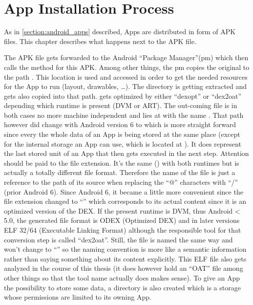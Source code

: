 \section{App Installation Process}\label{section:app_installation}
As in \autoref{section:android_apps} described, Apps are distributed
in form of APK files. This chapter describes what happens next to
the APK file.

The APK file gets forwarded to the Android ``Package Manager''(pm)
which then calls the  method for this
APK. Among other things, the pm copies the original 
to the path .
This location is used and accessed in order to get the
needed resources for the App to run (layout, drawables, \ldots).
The  directory is getting extracted and gets also copied
into that path.  gets optimized by either ``dexopt''
or ``dex2oat'' depending which runtime is present (DVM or ART).
The out-coming file is in both cases no more machine independent
and lies at  with the name
.
That path however did change with Android version 6 to
 which
is more straight forward since every the whole data of an App is being
stored at the same place (except for the internal storage an App can
use, which is located at ).
It does represent the last stored unit of an App that then
gets executed in the next step.
Attention should be paid to the file extension.
It's the same () with both runtimes but is actually a totally
different file format.
Therefore the name of the file is just a reference to the path
of its source when replacing the ``@'' characters with ``/'' (prior Android 6).
Since Android 6, it became a little more convenient since the file extension changed to ``'' which corresponds to its actual content since it is
an optimized version of the DEX.
If the present runtime is DVM, thus Android < 5.0, the generated
file format is ODEX (Optimized DEX) and in later versions
ELF 32/64 (Executable Linking Format) although the responsible
tool for that conversion step is called ``dex2oat''. Still, the file
is named the same way and won't change to ``'' so the naming
convention is more like a semantic information rather than saying something
about its content explicitly.
This ELF file also gets analyzed in the course of this thesis
(it does however hold an ``OAT'' file among other things so that
the tool name actually does makes sense).
To give an App the possibility to
store some data, a  directory is
also created which is a storage whose permissions are limited to its owning
App.

